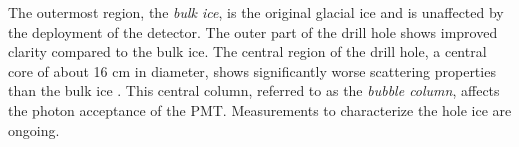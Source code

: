 The outermost region, the \emph{bulk ice}, is the original glacial ice and is unaffected by the deployment of the detector.
The outer part of the drill hole shows improved clarity compared to the bulk ice.
The central region of the drill hole, a central core of about 16 cm in diameter, shows significantly worse scattering properties than the bulk ice \cite{Description-IceCube}.
This central column, referred to as the \emph{bubble column}, affects the photon acceptance of the PMT.
Measurements to characterize the hole ice are ongoing.

